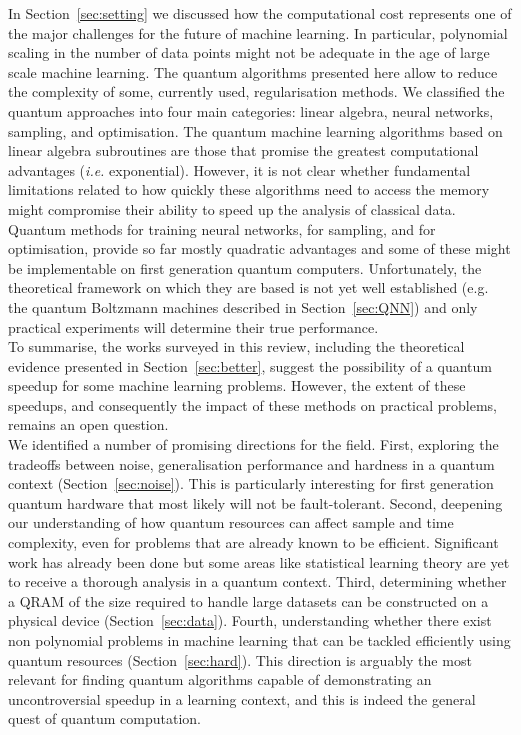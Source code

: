\documentclass[a4paper, 11pt]{article}
\begin{document}
In Section~\ref{sec:setting} we discussed how the computational cost represents one of the major challenges for the future of machine learning. In particular, polynomial scaling in the number of data points might not be adequate in the age of large scale machine learning. The quantum algorithms presented here allow to reduce the complexity of some, currently used, regularisation methods. We classified the quantum approaches into four main categories: linear algebra, neural networks, sampling, and optimisation. The quantum machine learning algorithms based on linear algebra subroutines are those that promise the greatest computational advantages (\textit{i.e.} exponential). However, it is not clear whether fundamental limitations related to how quickly these algorithms need to access the memory might compromise their ability to speed up the analysis of classical data. Quantum methods for training neural networks, for sampling, and for optimisation, provide so far mostly quadratic advantages and some of these might be implementable on first generation quantum computers. Unfortunately, the theoretical framework on which they are based is not yet well established (e.g. the quantum Boltzmann machines described in Section~\ref{sec:QNN}) and only practical experiments will determine their true performance.\\

To summarise, the works surveyed in this review, including the theoretical evidence presented in Section~\ref{sec:better}, suggest the possibility of a quantum speedup for some machine learning problems. However, the extent of these speedups, and consequently the impact of these methods on practical problems, remains an open question.\\

We identified a number of promising directions for the field. First, exploring the tradeoffs between noise, generalisation performance and hardness in a quantum context (Section~\ref{sec:noise}). This is particularly interesting for first generation quantum hardware that most likely will not be fault-tolerant. 
Second, deepening our understanding of how quantum resources can affect sample and time complexity, even for problems that are already known to be efficient. 
Significant work has already been done but some areas like statistical learning theory are yet to receive a thorough analysis in a quantum context. Third, determining whether a QRAM of the size required to handle large datasets can be constructed on a physical device (Section~\ref{sec:data}). Fourth, understanding whether there exist non polynomial problems in machine learning that can be tackled efficiently using quantum resources (Section~\ref{sec:hard}). This direction is arguably the most relevant for finding quantum algorithms capable of demonstrating an uncontroversial speedup in a learning context, and this is indeed the general quest of quantum computation.\\
\end{document}
